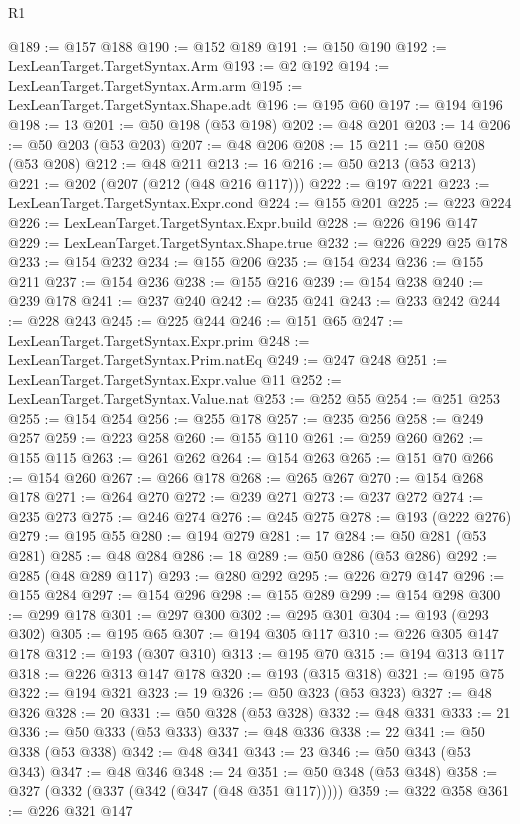 \begin{lexlean}{R1}
\begin{coremodule}
@189 := @157 @188
@190 := @152 @189
@191 := @150 @190
@192 := LexLeanTarget.TargetSyntax.Arm
@193 := @2 @192
@194 := LexLeanTarget.TargetSyntax.Arm.arm
@195 := LexLeanTarget.TargetSyntax.Shape.adt
@196 := @195 @60
@197 := @194 @196
@198 := 13
@201 := @50 @198 (@53 @198)
@202 := @48 @201
@203 := 14
@206 := @50 @203 (@53 @203)
@207 := @48 @206
@208 := 15
@211 := @50 @208 (@53 @208)
@212 := @48 @211
@213 := 16
@216 := @50 @213 (@53 @213)
@221 := @202 (@207 (@212 (@48 @216 @117)))
@222 := @197 @221
@223 := LexLeanTarget.TargetSyntax.Expr.cond
@224 := @155 @201
@225 := @223 @224
@226 := LexLeanTarget.TargetSyntax.Expr.build
@228 := @226 @196 @147
@229 := LexLeanTarget.TargetSyntax.Shape.true
@232 := @226 @229 @25 @178
@233 := @154 @232
@234 := @155 @206
@235 := @154 @234
@236 := @155 @211
@237 := @154 @236
@238 := @155 @216
@239 := @154 @238
@240 := @239 @178
@241 := @237 @240
@242 := @235 @241
@243 := @233 @242
@244 := @228 @243
@245 := @225 @244
@246 := @151 @65
@247 := LexLeanTarget.TargetSyntax.Expr.prim
@248 := LexLeanTarget.TargetSyntax.Prim.natEq
@249 := @247 @248
@251 := LexLeanTarget.TargetSyntax.Expr.value @11
@252 := LexLeanTarget.TargetSyntax.Value.nat
@253 := @252 @55
@254 := @251 @253
@255 := @154 @254
@256 := @255 @178
@257 := @235 @256
@258 := @249 @257
@259 := @223 @258
@260 := @155 @110
@261 := @259 @260
@262 := @155 @115
@263 := @261 @262
@264 := @154 @263
@265 := @151 @70
@266 := @154 @260
@267 := @266 @178
@268 := @265 @267
@270 := @154 @268 @178
@271 := @264 @270
@272 := @239 @271
@273 := @237 @272
@274 := @235 @273
@275 := @246 @274
@276 := @245 @275
@278 := @193 (@222 @276)
@279 := @195 @55
@280 := @194 @279
@281 := 17
@284 := @50 @281 (@53 @281)
@285 := @48 @284
@286 := 18
@289 := @50 @286 (@53 @286)
@292 := @285 (@48 @289 @117)
@293 := @280 @292
@295 := @226 @279 @147
@296 := @155 @284
@297 := @154 @296
@298 := @155 @289
@299 := @154 @298
@300 := @299 @178
@301 := @297 @300
@302 := @295 @301
@304 := @193 (@293 @302)
@305 := @195 @65
@307 := @194 @305 @117
@310 := @226 @305 @147 @178
@312 := @193 (@307 @310)
@313 := @195 @70
@315 := @194 @313 @117
@318 := @226 @313 @147 @178
@320 := @193 (@315 @318)
@321 := @195 @75
@322 := @194 @321
@323 := 19
@326 := @50 @323 (@53 @323)
@327 := @48 @326
@328 := 20
@331 := @50 @328 (@53 @328)
@332 := @48 @331
@333 := 21
@336 := @50 @333 (@53 @333)
@337 := @48 @336
@338 := 22
@341 := @50 @338 (@53 @338)
@342 := @48 @341
@343 := 23
@346 := @50 @343 (@53 @343)
@347 := @48 @346
@348 := 24
@351 := @50 @348 (@53 @348)
@358 := @327 (@332 (@337 (@342 (@347 (@48 @351 @117)))))
@359 := @322 @358
@361 := @226 @321 @147

\end{coremodule}
\end{lexlean}
